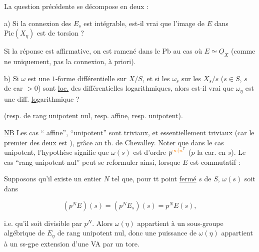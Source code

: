 La question précédente se décompose en deux :


a) Si la connexion des $E_s$  est intégrable, est-il vrai que l'image de $E$ dans $\mathrm{Pic}(X_\eta)$ est de torsion ?

 Si la réponse est affirmative, on est ramené dans le Pb au cas où $E\simeq\underline O_X$ (comme ne uniquement, pas la connexion, à priori).


b) Si $\omega$ est une $1$-forme différentielle \inserted{[fermée]} sur $X/S$, et si les $\omega_s$ sur les $X_s/s$ ($s\in S$, $s$ de car $>0$) sont \uline{loc.} des différentielles logarithmiques, alors est-il vrai que  $\omega_\eta$ est une diff. \uline{log}arithmique ?



(resp. de rang unipotent nul, resp. affine, resp. unipotent).

\uline{NB} Les cas `` affine'', ``unipotent'' sont triviaux, et essentiellement triviaux  (car le premier des deux est ), grâce au th. de Chevalley. Noter que dans le cas unipotent, l'hypothèse signifie que $\omega(s)$ est d'ordre $p^{\unsure{\infty|n}}$ ($p$ la car. en $s$). Le cas  ``rang unipotent nul'' peut se reformuler ainsi, lorsque $E$ est commutatif :


Supposons qu'il existe un entier $N$ tel que, pour tt point \uline{fermé} $s$ de $S$, $\omega(s)$ soit  dans

\[
(p^NE)(s)=(p^NE_s)(s)=p^NE(s),
\]

i.e. qu'il soit divisible par $p^N$. Alors $\omega(\eta)$ appartient à un sous-groupe algébrique de $E_{\eta}$ de rang  unipotent nul, donc une puissance de $\omega(\eta)$ appartient à un ss-gpe extension d'une VA par un tore.



